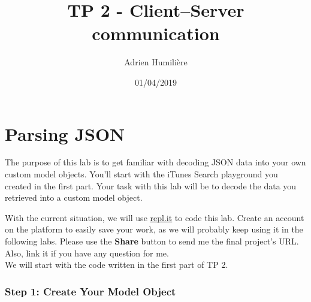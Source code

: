 \documentclass[a4paper,11pt]{scrartcl}
\begin{document}
\newcommand{\mytitle}{\textsf{\textbf{TP 2 - Client–Server communication}}}
\title{\mytitle}
\author{Adrien Humilière}
\date{01/04/2019}

\maketitle

\setcounter{part}{1}
\part{Parsing JSON}

The purpose of this lab is to get familiar with decoding JSON data into your own custom model objects. You'll start with the iTunes Search playground you created in the first part. Your task with this lab will be to decode the data you retrieved into a custom model object.

With the current situation, we will use \href{https://repl.it/languages/swift}{\underline{repl.it}} to code this lab. Create an account on the platform to easily save your work, as we will probably keep using it in the following labs. Please use the \textbf{Share} button to send me the final project's URL. Also, link it if you have any question for me.\\

We will start with the code written in the first part of TP 2.

\section*{Step 1: Create Your Model Object}
\end{document}

